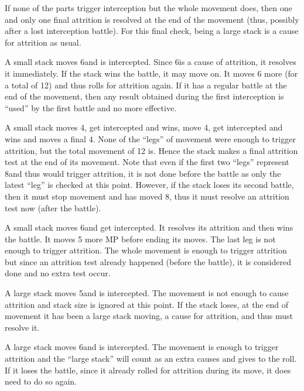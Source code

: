 If none of the parts trigger interception but the whole movement does, then
one and only one final attrition is resolved at the end of the movement (thus,
possibly after a lost interception battle). For this final check, being a
large stack is a cause for attrition as usual.

\begin{exemple}
  A small stack moves 6\MP and is intercepted. Since 6\MP is a cause of
  attrition, it resolves it immediately. If the stack wins the battle, it may
  move on. It moves 6 more \MP (for a total of 12) and thus rolls for
  attrition again. If it has a regular battle at the end of the movement, then
  any  result obtained during the first interception is
  ``used'' by the first battle and no more effective.

  \smallskip

  A small stack moves 4\MP, get intercepted and wins, move 4\MP, get
  intercepted and wins and moves a final 4\MP. None of the ``legs'' of
  movement were enough to trigger attrition, but the total movement of 12\MP
  is. Hence the stack makes a final attrition test at the end of its
  movement. Note that even if the first two ``legs'' represent 8\MP and thus
  would trigger attrition, it is not done before the battle as only the latest
  ``leg'' is checked at this point. However, if the stack loses its second
  battle, then it must stop movement and has moved 8\MP, thus it must resolve
  an attrition test now (after the battle).

  \smallskip

  A small stack moves 6\MP and get intercepted. It resolves its attrition and
  then wins the battle. It moves 5 more MP before ending its moves. The last
  leg is not enough to trigger attrition. The whole movement is enough to
  trigger attrition but since an attrition test already happened (before the
  battle), it is considered done and no extra test occur.

  \smallskip

  A large stack moves 5\MP and is intercepted. The movement is not enough to
  cause attrition and stack size is ignored at this point. If the stack loses,
  at the end of movement it has been a large stack moving, a cause for
  attrition, and thus must resolve it.

  A large stack moves 6\MP and is intercepted. The movement is enough to
  trigger attrition and the ``large stack'' will count as an extra causes and
  gives  to the roll. If it loses the battle, since it already
  rolled for attrition during its move, it does need to do so again.
\end{exemple}

